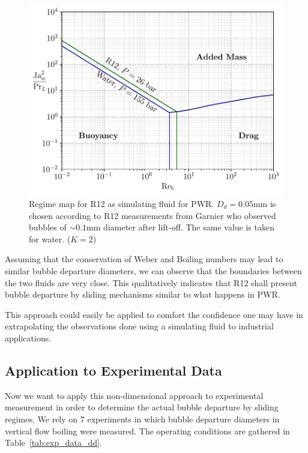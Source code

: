 \begin{figure}[h!]
\centering
\includegraphics[width=0.6\linewidth]{img/bub_dyn/dep_maps/R12_PWR.pdf}
\caption{Regime map for R12 as simulating fluid for PWR. $D_{d}=0.05$mm is chosen according to R12 measurements from Garnier \etal \cite{garnier_local_2001} who observed bubbles of $\sim 0.1$mm diameter after lift-off.  The same value is taken for water. ($K=2$)}
\label{fig:R12_PWR_map}
\end{figure}


Assuming that the conservation of Weber and Boiling numbers may lead to similar bubble departure diameters, we can observe that the boundaries between the two fluids are very close. This qualitatively indicates that R12 shall present bubble departure by sliding mechanisms similar to what happens in PWR.

\begin{remark*}{}
This approach could easily be applied to comfort the confidence one may have in extrapolating the observations done using a simulating fluid to industrial applications.
\end{remark*} 





\subsection{Application to Experimental Data}\label{subsec:data_map}

Now we want to apply this non-dimensional approach to experimental measurement in order to determine the actual bubble departure by sliding regimes. We rely on 7 experiments in which bubble departure diameters in vertical flow boiling were measured. The operating conditions are gathered in Table~\ref{tab:exp_data_dd}.




